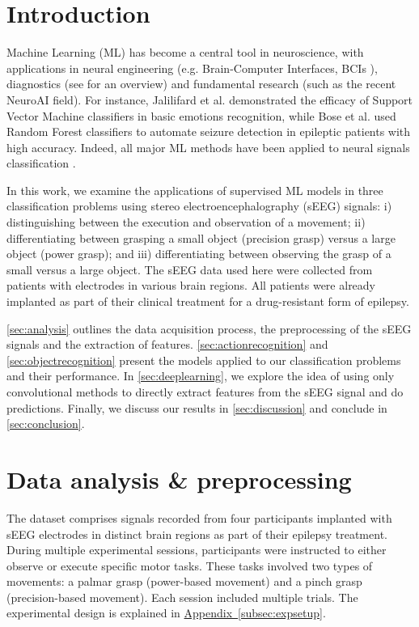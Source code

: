 \documentclass[10pt,conference,compsocconf]{IEEEtran}
\newcommand{\aref}[1]{\hyperref[#1]{Appendix~\ref*{#1}}}
\begin{document}
\section{Introduction}
Machine Learning (ML) has become a central tool in neuroscience, with applications in neural engineering (e.g. Brain-Computer Interfaces, BCIs \cite{eegforbci}), diagnostics (see \cite{VIEIRA201758} for an overview) and fundamental research (such as the recent NeuroAI field). For instance, Jalilifard et al. \cite{EmotionClassificationSVM} demonstrated the efficacy of Support Vector Machine classifiers in basic emotions recognition, while Bose et al. \cite{EEGRandomForset} used Random Forest classifiers to automate seizure detection in epileptic patients with high accuracy. Indeed, all major ML methods have been applied to neural signals classification \cite{EEGMLReview}.

In this work, we examine the applications of supervised ML models in three classification problems using stereo electroencephalography (sEEG) signals: i) distinguishing between the execution and observation of a movement; ii) differentiating between grasping a small object (precision grasp) versus a large object (power grasp); and iii) differentiating between observing the grasp of a small versus a large object. The sEEG data used here were collected from patients with electrodes in various brain regions. All patients were already implanted as part of their clinical treatment for a drug-resistant form of epilepsy.


\autoref{sec:analysis} outlines the data acquisition process, the preprocessing of the sEEG signals and the extraction of features. \autoref{sec:actionrecognition} and \autoref{sec:objectrecognition} present the models applied to our classification problems and their performance. In \autoref{sec:deeplearning}, we explore the idea of using only convolutional methods to directly extract features from the sEEG signal and do predictions. Finally, we discuss our results in \autoref{sec:discussion} and conclude in \autoref{sec:conclusion}.

\section{Data analysis \& preprocessing}
\label{sec:analysis}
The dataset comprises signals recorded from four participants implanted with sEEG electrodes in distinct brain regions as part of their epilepsy treatment. During multiple experimental sessions, participants were instructed to either observe or execute specific motor tasks. These tasks involved two types of movements: a palmar grasp (power-based movement) and a pinch grasp (precision-based movement). Each session included multiple trials. The experimental design is explained in \aref{subsec:expsetup}.
\end{document}
